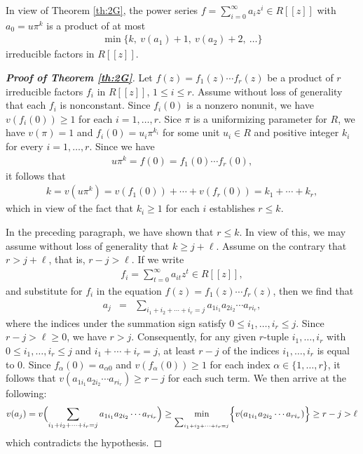 \documentclass[12pt,reqno]{amsart}%
\begin{document}
In view of Theorem \ref{th:2G}, the power series $f = \sum_{i=0}^\infty a_i z^i\in R[[z]]$ with $a_0=u \pi^k$  is a product of  at most
\begin{eqnarray*}
\min\{k,~v(a_1)+1,~v(a_2)+2,~\ldots\}
\end{eqnarray*}
irreducible factors in $R[[z]]$.
\begin{proof}[\bf Proof of Theorem \ref{th:2G}]
Let $f(z)=f_1(z)\cdots f_r(z)$ be a product of $r$ irreducible factors $f_i$ in $R[[z]]$, $1\leq i\leq r$.  Assume without loss of generality that each $f_i$ is nonconstant. Since $f_i(0)$ is a nonzero nonunit, we have  $v(f_i(0))\geq 1$ for each $i=1,\ldots,r$. Sice $\pi$ is a uniformizing parameter for $R$, we have $v(\pi)=1$ and $f_i(0)=u_i\pi^{k_i}$ for some unit $u_i\in R$ and positive integer $k_i$ for every $i=1,\ldots,r$. Since we have
\begin{eqnarray*}
u\pi^k=f(0)=f_1(0)\cdots f_r(0),
\end{eqnarray*}
it follows that
\begin{eqnarray*}
k=v(u\pi^k)=v(f_1(0))+\cdots +v(f_r(0))=k_1+\cdots+k_r,
\end{eqnarray*}
which in view of the fact that $k_i\geq 1$ for each $i$ establishes $r\leq k$.

In the preceding paragraph, we have shown that $r\leq k$. In view of this, we may assume without loss of generality that $k\geq j+\ell$. Assume on the contrary that $r>j+\ell$, that is, $r-j> \ell$. If we write
\begin{eqnarray*}
f_i=\sum_{t=0}^{\infty}a_{it}z^t\in R[[z]],
\end{eqnarray*}
and substitute for $f_i$ in the equation $f(z)=f_1(z)\cdots f_r(z)$, then we find that
\begin{eqnarray*}
a_j &=& \sum_{i_1+i_2+\cdots+i_r=j}a_{1i_1}a_{2i_2}\cdots a_{ri_r},
\end{eqnarray*}
where the indices under the summation sign satisfy $0\leq i_1,\ldots,i_r\leq j$. Since $r-j>\ell\geq 0$, we have $r>j$. Consequently, for any given $r$-tuple $i_1,\ldots,i_r$ with $0\leq i_1,\ldots,i_r\leq j$ and $i_1+\cdots+i_r=j$, at least $r-j$ of the indices $i_1,\ldots,i_r$ is equal to 0. Since  $f_\alpha(0)=a_{\alpha0}$ and $v(f_\alpha(0))\geq 1$ for each index $\alpha\in \{1,\ldots,r\}$, it follows that  $v(a_{1i_1}a_{2i_2}\cdots a_{ri_r})\geq r-j$ for each such term. We then arrive at the following:
\begin{eqnarray*}
v(a_j)=v\Bigl(\sum_{i_1+i_2+\cdots+i_r=j}a_{1i_1}a_{2i_2}\cdots a_{ri_r}\Bigr)\geq \min_{\sum_{i_1+i_2+\cdots+i_r=j}} \Bigl\{v(a_{1i_1}a_{2i_2}\cdots a_{ri_r})\Bigr\}\geq r-j>\ell
\end{eqnarray*}
which contradicts the hypothesis.
\end{proof}
\end{document}

